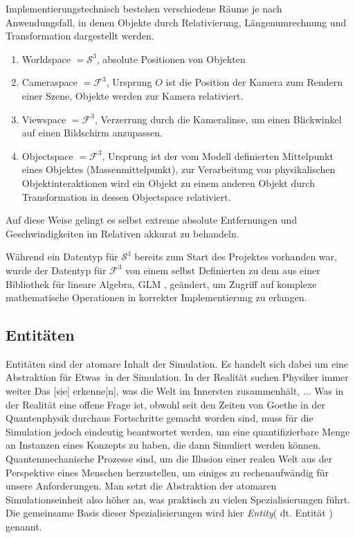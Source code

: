 Implementierungstechnisch bestehen verschiedene Räume je nach Anwendungsfall, in denen Objekte durch Relativierung, Längenumrechnung und Transformation dargestellt werden.

\begin{enumerate}
\item Worldspace $= \mathcal{S}^3$, absolute Positionen von Objekten
\item Cameraspace $= \mathcal{F}^3$, Ursprung $O$ ist die Position der Kamera zum Rendern einer Szene, Objekte werden zur Kamera relativiert.
\item Viewspace $= \mathcal{F}^3$, Verzerrung durch die Kameralinse, um einen Blickwinkel auf einen Bildschirm anzupassen.
\item Objectspace $= \mathcal{F}^3$, Ursprung ist der vom Modell definierten Mittelpunkt eines Objektes (Massenmittelpunkt), zur Verarbeitung von physikalischen Objektinteraktionen wird ein Objekt zu einem anderen Objekt durch Transformation in dessen Objectspace relativiert.
\end{enumerate}

Auf diese Weise gelingt es selbst extreme absolute Entfernungen und Geschwindigkeiten im Relativen akkurat zu behandeln.

Während ein Datentyp für $\mathcal{S}^3$ bereits zum Start des Projektes vorhanden war, wurde der Datentyp für $\mathcal{F}^3$ von einem selbst Definierten zu dem aus einer Bibliothek für lineare Algebra, GLM %
, geändert, um Zugriff auf komplexe mathematische Operationen in korrekter Implementierung zu erlangen.

\subsection{Entitäten}
\label{sec:entity}
Entitäten sind der atomare Inhalt der Simulation. Es handelt sich dabei um eine Abstraktion für \glqq Etwas\grqq ~in der Simulation. In der Realität suchen Physiker immer weiter \glqq Das [sie] erkenne[n], was die Welt im Innersten zusammenhält, ... Was in der Realität eine offene Frage ist, obwohl seit den Zeiten von Goethe in der Quantenphysik durchaus Fortschritte gemacht worden sind, muss für die Simulation jedoch eindeutig beantwortet werden, um eine quantifizierbare Menge an Instanzen eines Konzepts zu haben, die dann Simuliert werden können.\\
Quantenmechanische Prozesse sind, um die Illusion einer realen Welt aus der Perspektive eines Menschen herzustellen, um einiges zu rechenaufwändig für unsere Anforderungen. Man setzt die Abstraktion der atomaren Simulationseinheit also höher an, was praktisch zu vielen Spezialisierungen führt. Die gemeinsame Basis dieser Spezialisierungen wird hier \textit{Entity}( dt. Entität ) genannt.\\

